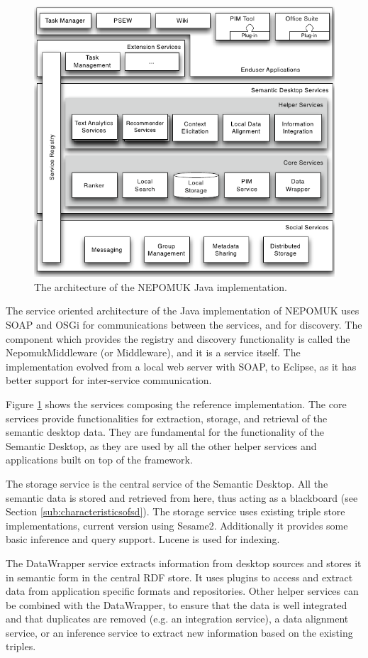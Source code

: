 \begin{figure}[tb]
 \includegraphics[width=0.8\linewidth]{chapters/background/img/javaarchitecture.png}
\caption{The architecture of the NEPOMUK Java implementation.}
\label{fig:nepomukjava}
\end{figure} 

The service oriented architecture of the Java implementation of NEPOMUK uses SOAP and OSGi for communications between the services, and for discovery. The component which provides the registry and discovery functionality is called the NepomukMiddleware (or Middleware), and it is a service itself. The implementation evolved from a local web server with SOAP, to Eclipse, as it has better support for inter-service communication.

Figure \ref{fig:nepomukjava} \cite{Reif2008} shows the services composing the reference implementation. The core services provide functionalities for extraction, storage, and retrieval of the semantic desktop data. They are fundamental for the functionality of the Semantic Desktop, as they are used by all the other helper services and applications built on top of the framework. 

The storage service is the central service of the Semantic Desktop. All the semantic data is stored and retrieved from here, thus acting as a blackboard (see Section \ref{sub:characteristicsofsd}). The storage service uses existing triple store implementations, current version using Sesame2. Additionally it provides some basic inference and query support. Lucene is used for indexing. 

The DataWrapper service extracts information from desktop sources and stores it in semantic form in the central RDF store. It uses plugins to access and extract data from application specific formats and repositories. Other helper services can be combined with the DataWrapper, to ensure that the data is well integrated and that duplicates are removed (e.g. an integration service), a data alignment service, or an inference service to extract new information based on the existing triples. 


